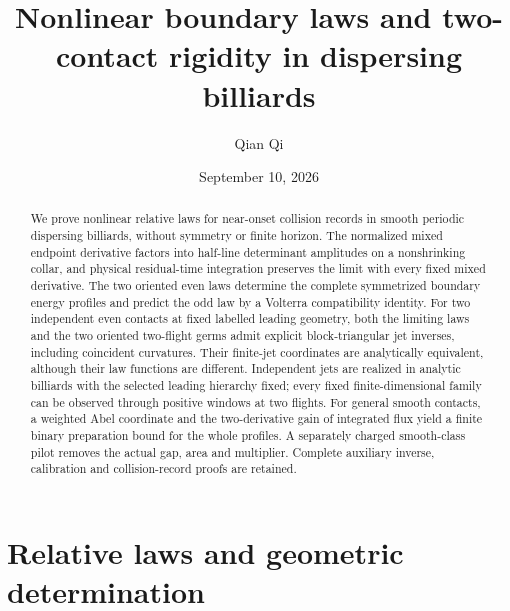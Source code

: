 
\title[Nonlinear boundary laws and two-contact rigidity]{Nonlinear boundary laws and two-contact rigidity
in dispersing billiards}
\author{Qian Qi}
\date{September 10, 2026}

\begin{abstract}
We prove nonlinear relative laws for near-onset collision records in
smooth periodic dispersing billiards, without symmetry or finite horizon.
The normalized mixed endpoint derivative factors into half-line
determinant amplitudes on a nonshrinking collar, and physical
residual-time integration preserves the limit with every fixed mixed
derivative. The two oriented even laws determine the complete
symmetrized boundary energy profiles and predict the odd law by a
Volterra compatibility identity. For two independent even contacts at
fixed labelled leading geometry, both the limiting laws and the two
oriented two-flight germs admit explicit block-triangular jet inverses,
including coincident curvatures. Their finite-jet coordinates are
analytically equivalent, although their law functions are different.
Independent jets are realized in analytic billiards with the selected
leading hierarchy fixed; every fixed finite-dimensional family can be
observed through positive windows at two flights. For general smooth
contacts, a weighted Abel coordinate and the two-derivative gain of
integrated flux yield a finite binary preparation bound for the whole
profiles. A separately charged smooth-class pilot removes the actual
gap, area and multiplier. Complete auxiliary inverse, calibration and
collision-record proofs are retained.
\end{abstract}
\maketitle

\part{Relative laws and geometric determination}










